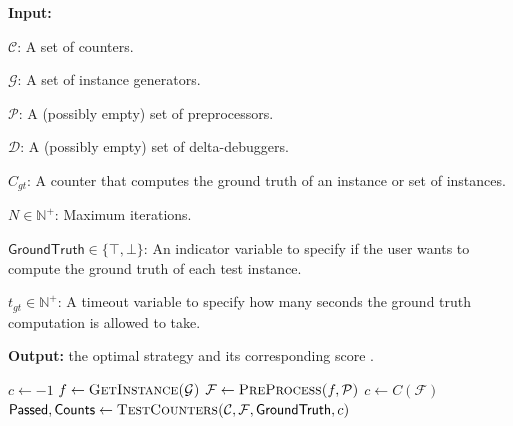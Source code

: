 \documentclass[a4paper]{tufte-handout}
\begin{document}
	\begin{algorithm}[ht]
		\caption{CountFuzz}
		\label{algo:count-fuzz}
		\hspace*{\algorithmicindent} \textbf{Input:} 
			\begin{compactitem}
			 \item $\mathcal{C}$: A set of counters.
			 \item $\mathcal{G}$: A set of instance generators.
			 \item $\mathcal{P}$: A (possibly empty) set of preprocessors.
			 \item $\mathcal{D}$: A (possibly empty) set of delta-debuggers.
			 \item $C_{gt}$: A counter that computes the ground truth of an instance or set of instances.
			 \item $N \in \mathbb{N}^+$: Maximum iterations.
			 \item $\textsf{GroundTruth} \in \{\top, \bot\}$: An indicator variable to specify if the user wants to compute the ground truth of each test instance.
			 \item $t_{gt} \in \mathbb{N}^+$: A timeout variable to specify how many seconds the ground truth computation is allowed to take.
			\end{compactitem}
		\hspace*{\algorithmicindent} \textbf{Output:} the optimal strategy and its corresponding score .
		
		\begin{algorithmic}[1]
		 \Statex
		    \State $c \gets -1$
				\State $f \gets \textsc{GetInstance(}\mathcal{G}\textsc{)}$
				\State $\mathcal{F} \gets \textsc{PreProcess(}f, \mathcal{P}\textsc{)}$
					\State $c \gets C(\mathcal{F})$
				\EndIf
				\State $\textsf{Passed}, \textsf{Counts} \gets \textsc{TestCounters(} \mathcal{C}, \mathcal{F}, \textsf{GroundTruth}, c\textsc{)}$
				\State 
		   \EndFor
		 \EndProcedure
		\end{algorithmic}
	   \end{algorithm}
\end{document}
